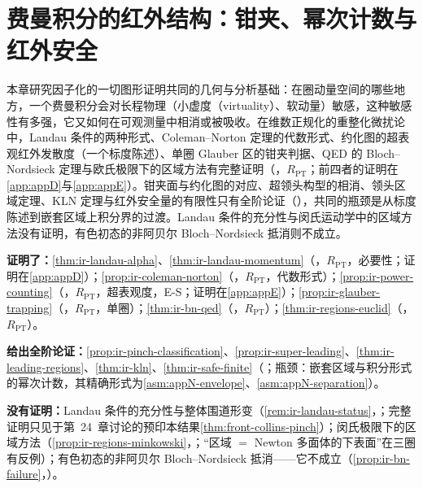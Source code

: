 \chapter{费曼积分的红外结构：钳夹、幂次计数与红外安全}\label{ch:ir}

本章研究因子化的一切图形证明共同的几何与分析基础：在圈动量空间的哪些地方，一个费曼积分会对长程物理（小虚度（virtuality）、软动量）敏感，这种敏感性有多强，它又如何在可观测量中相消或被吸收。在维数正规化的重整化微扰论中，Landau 条件的两种形式、Coleman--Norton 定理的代数形式、约化图的超表观红外发散度（一个标度陈述）、单圈 Glauber 区的钳夹判据、QED 的 Bloch--Nordsieck 定理与欧氏极限下的区域方法有完整证明（\tagR，$R_{\mathrm{PT}}$；前四者的证明在\cref{app:appD}与\cref{app:appE}）。钳夹面与约化图的对应、超领头构型的相消、领头区域定理、KLN 定理与红外安全量的有限性只有全阶论证（\tagA），共同的瓶颈是从标度陈述到嵌套区域上积分界的过渡。Landau 条件的充分性与闵氏运动学中的区域方法没有证明，有色初态的非阿贝尔 Bloch--Nordsieck 抵消则不成立。

\begin{tcolorbox}[enhanced,breakable,title=本章证明了什么／没有证明什么,fonttitle=\bfseries,
  colback=gray!3!white,colframe=gray!55!black,boxrule=0.6pt,arc=2pt,
  left=5pt,right=5pt,top=3pt,bottom=3pt,before skip=6pt,after skip=6pt]
\textbf{证明了：}\cref{thm:ir-landau-alpha}、\cref{thm:ir-landau-momentum}（\tagR，$R_{\mathrm{PT}}$，必要性；证明在\cref{app:appD}）；\cref{prop:ir-coleman-norton}（\tagR，$R_{\mathrm{PT}}$，代数形式）；\cref{prop:ir-power-counting}（\tagR，$R_{\mathrm{PT}}$，超表观度，E-S；证明在\cref{app:appE}）；\cref{prop:ir-glauber-trapping}（\tagR，$R_{\mathrm{PT}}$，单圈）；\cref{thm:ir-bn-qed}（\tagR，$R_{\mathrm{PT}}$）；\cref{thm:ir-regions-euclid}（\tagR，$R_{\mathrm{PT}}$）。\par
\textbf{给出全阶论证：}\cref{prop:ir-pinch-classification}、\cref{prop:ir-super-leading}、\cref{thm:ir-leading-regions}、\cref{thm:ir-kln}、\cref{thm:ir-safe-finite}（\tagA；瓶颈：嵌套区域与积分形式的幂次计数，其精确形式为\cref{asm:appN-envelope}、\cref{asm:appN-separation}）。\par
\textbf{没有证明：}Landau 条件的充分性与整体围道形变（\cref{rem:ir-landau-status}，\tagA；完整证明只见于第~24~章讨论的预印本结果\cref{thm:front-collins-pinch}）；闵氏极限下的区域方法（\cref{prop:ir-regions-minkowski}，\tagP；“区域 $=$ Newton 多面体的下表面”在三圈有反例）；有色初态的非阿贝尔 Bloch--Nordsieck 抵消——它不成立（\cref{prop:ir-bn-failure}，\tagV）。
\end{tcolorbox}

